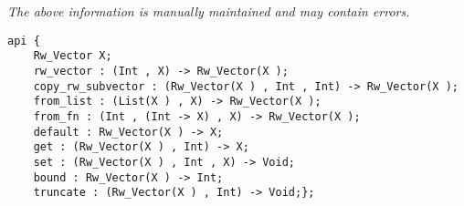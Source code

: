 \label{api:Expanding\_Rw\_Vector}

{\tiny \it The above information is manually maintained and may contain errors.}
\begin{verbatim}
api {
    Rw_Vector X;
    rw_vector : (Int , X) -> Rw_Vector(X );
    copy_rw_subvector : (Rw_Vector(X ) , Int , Int) -> Rw_Vector(X );
    from_list : (List(X ) , X) -> Rw_Vector(X );
    from_fn : (Int , (Int -> X) , X) -> Rw_Vector(X );
    default : Rw_Vector(X ) -> X;
    get : (Rw_Vector(X ) , Int) -> X;
    set : (Rw_Vector(X ) , Int , X) -> Void;
    bound : Rw_Vector(X ) -> Int;
    truncate : (Rw_Vector(X ) , Int) -> Void;};
\end{verbatim}
